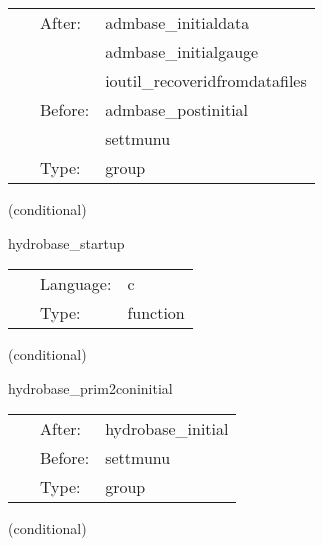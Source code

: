 \hspace{5mm}

 \begin{tabular*}{160mm}{cll} 
~ & After:  & admbase\_initialdata \\ 
~& ~ &admbase\_initialgauge\\ 
~& ~ &ioutil\_recoveridfromdatafiles\\ 
~ & Before:  & admbase\_postinitial \\ 
~& ~ &settmunu\\ 
~ & Type:  & group \\ 
\end{tabular*} 


\vspace{5mm}

   (conditional) 

\hspace{5mm} hydrobase\_startup 

\hspace{5mm}{\it startup banner } 


\hspace{5mm}

 \begin{tabular*}{160mm}{cll} 
~ & Language:  & c \\ 
~ & Type:  & function \\ 
\end{tabular*} 


\vspace{5mm}

   (conditional) 

\hspace{5mm} hydrobase\_prim2coninitial 

\hspace{5mm}{\it recover the conservative variables from the primitive variables } 


\hspace{5mm}

 \begin{tabular*}{160mm}{cll} 
~ & After:  & hydrobase\_initial \\ 
~ & Before:  & settmunu \\ 
~ & Type:  & group \\ 
\end{tabular*} 


\vspace{5mm}

   (conditional) 

